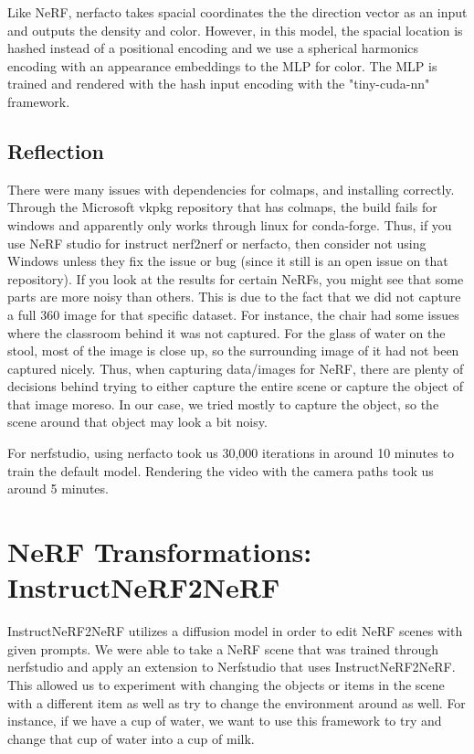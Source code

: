 \documentclass{article}
\begin{document}
Like NeRF, nerfacto takes spacial coordinates the the direction vector as an input and outputs the density and color. However, in this model, the spacial location is hashed instead of a positional encoding and we use a spherical harmonics encoding with an appearance embeddings to the MLP for color. The MLP is trained and rendered with the hash input encoding with the "tiny-cuda-nn" framework.

\subsection{Reflection}

There were many issues with dependencies for colmaps, and installing correctly. Through the Microsoft vkpkg repository that has colmaps, the build fails for windows and apparently only works through linux for conda-forge. Thus, if you use NeRF studio for instruct nerf2nerf or nerfacto, then consider not using Windows unless they fix the issue or bug (since it still is an open issue on that repository). If you look at the results for certain NeRFs, you might see that some parts are more noisy than others. This is due to the fact that we did not capture a full 360 image for that specific dataset. For instance, the chair had some issues where the classroom behind it was not captured. For the glass of water on the stool, most of the image is close up, so the surrounding image of it had not been captured nicely. Thus, when capturing data/images for NeRF, there are plenty of decisions behind trying to either capture the entire scene or capture the object of that image moreso. In our case, we tried mostly to capture the object, so the scene around that object may look a bit noisy. 

For nerfstudio, using nerfacto took us 30,000 iterations in around 10 minutes to train the default model. Rendering the video with the camera paths took us around 5 minutes.

\section{NeRF Transformations: InstructNeRF2NeRF}

InstructNeRF2NeRF utilizes a diffusion model in order to edit NeRF scenes with given prompts. We were able to take a NeRF scene that was trained through nerfstudio and apply an extension to Nerfstudio that uses InstructNeRF2NeRF. This allowed us to experiment with changing the objects or items in the scene with a different item as well as try to change the environment around as well. For instance, if we have a cup of water, we want to use this framework to try and change that cup of water into a cup of milk.
\end{document}
